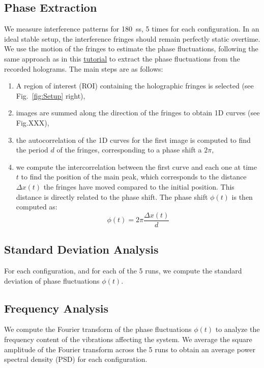 \documentclass[11pt,a4paper]{article}
\begin{document}
\subsection{Phase Extraction}
We measure interference patterns for \SI{180}{s}s, 5 times for each configuration.
In an ideal stable setup, the interference fringes should remain perfectly
static overtime. We use the motion of the fringes to estimate the phase
fluctuations, following the same approach as in this
\href{https://www.wavefrontshaping.net/post/id/15}{tutorial} to extract the
phase fluctuations from the recorded holograms. The main steps are as follows:
\begin{enumerate}
	\item A region of interest (ROI) containing the holographic fringes is
	      selected (see Fig.~\ref{fig:Setup} right),
	\item images are summed along the direction of the fringes to obtain 1D
	      curves (see Fig.XXX),
	\item the autocorrelation of the 1D curves for the first image is computed to find the period $d$
	      of the fringes, corresponding to a phase shift a $2\pi$,
	\item we compute the intercorrelation between the first curve and each
	      one at time $t$ to find the position of the main peak, which corresponds to
	      the distance $\Delta x(t)$ the fringes have moved compared to the initial position. This
	      distance is directly related to the phase shift. The phase shift $\phi(t)$
	      is then computed as:
	      \begin{equation}
		      \phi(t) = 2\pi \frac{\Delta x(t)}{d}
	      \end{equation}
\end{enumerate}

\subsection{Standard Deviation Analysis}
For each configuration, and for each of the 5 runs,
we compute the standard deviation of phase fluctuations $\phi(t)$.

\subsection{Frequency Analysis}

We compute the Fourier transform of the phase fluctuations $\phi(t)$ to analyze
the frequency content of the vibrations affecting the system.
We average the square amplitude of the Fourier transform across the 5 runs to
obtain an average power spectral density (PSD) for each configuration.
\end{document}
